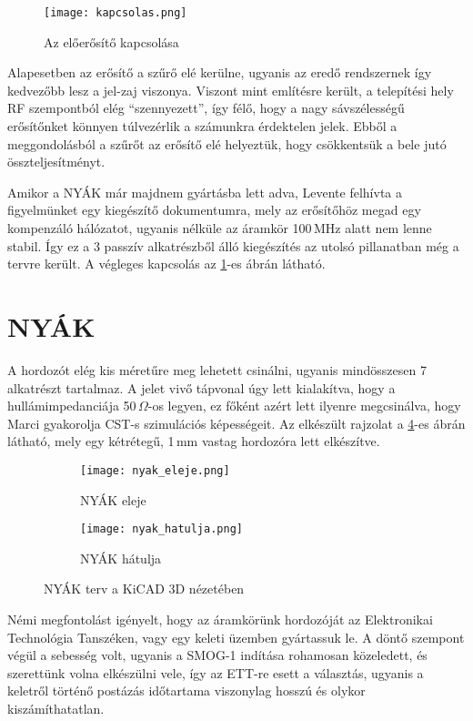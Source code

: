 \begin{figure}[!ht]
	\centering
	\texttt{[image: kapcsolas.png]}
	\caption{Az előerősítő kapcsolása}
	\label{fig:LNA_sch}
\end{figure}

Alapesetben az erősítő a szűrő elé kerülne, ugyanis az eredő rendszernek így kedvezőbb lesz a jel-zaj viszonya. Viszont mint említésre került, a telepítési hely RF szempontból elég \enquote{szennyezett}, így félő, hogy a nagy sávszélességű erősítőnket könnyen túlvezérlik a számunkra érdektelen jelek. Ebből a meggondolásból a szűrőt az erősítő elé helyeztük, hogy csökkentsük a bele jutó összteljesítményt.

Amikor a NYÁK már majdnem gyártásba lett adva, Levente felhívta a figyelmünket egy kiegészítő dokumentumra\cite{PGA_comp}, mely az erősítőhöz megad egy kompenzáló hálózatot, ugyanis nélküle az áramkör 100\,MHz alatt nem lenne stabil. Így ez a 3 passzív alkatrészből álló kiegészítés az utolsó pillanatban még a tervre került. A végleges kapcsolás az \ref{fig:LNA_sch}-es ábrán látható.


\section{NYÁK}
\label{sec:nyak}

A hordozót elég kis méretűre meg lehetett csinálni, ugyanis mindösszesen 7 alkatrészt tartalmaz. A jelet vivő tápvonal úgy lett kialakítva, hogy a hullámimpedanciája 50\,$\Omega$-os legyen, ez főként azért lett ilyenre megcsinálva, hogy Marci gyakorolja CST-s szimulációs képességeit. Az elkészült rajzolat a \ref{fig:nyak}-es ábrán látható, mely egy kétrétegű, 1\,mm vastag hordozóra lett elkészítve.

\begin{figure}[!ht]
	\centering
	\begin{subfigure}[b]{0.49\textwidth}
		\texttt{[image: nyak\_eleje.png]}
		\caption{NYÁK eleje}
		\label{fig:nyak_elol}
	\end{subfigure}
	\begin{subfigure}[b]{0.49\textwidth}
		\texttt{[image: nyak\_hatulja.png]}
		\caption{NYÁK hátulja}
		\label{fig:nyak_hatul}
	\end{subfigure}
	\caption{NYÁK terv a KiCAD 3D nézetében}
	\label{fig:nyak}
\end{figure}

Némi megfontolást igényelt, hogy az áramkörünk hordozóját az Elektronikai Technológia Tanszéken, vagy egy keleti üzemben gyártassuk le. A döntő szempont végül a sebesség volt, ugyanis a SMOG-1 indítása rohamosan közeledett, és szerettünk volna elkészülni vele, így az ETT-re esett a választás, ugyanis a keletről történő postázás időtartama viszonylag hosszú és olykor kiszámíthatatlan.


